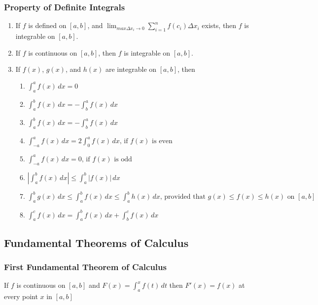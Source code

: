 \documentclass[11pt]{article}
\begin{document}
\subsubsection*{Property of Definite Integrals}
\begin{enumerate}
    \item If $f$ is defined on $[a,b]$, and $\displaystyle\lim_{max \Delta x_i\to 0}\sum_{i=1}^{n}f(c_i)\Delta x_i$ exists, 
        then $f$ is integrable on $[a,b]$.
    \item If $f$ is continuous on $[a,b]$, then $f$ is integrable on $[a,b]$.
    \item If $f(x)$, $g(x)$, and $h(x)$ are integrable on $[a,b]$, then
    \begin{enumerate}
        \item $
            \displaystyle
            \int_a^af(x)\,dx =0
        $
        \item $
            \displaystyle
            \int_a^bf(x)\,dx =-\int_b^af(x)\,dx
        $
        \item $
            \displaystyle
            \int_a^bf(x)\,dx =-\int_b^af(x)\,dx
        $
        \item $
            \displaystyle
            \int_{-a}^af(x)\,dx =2\int_0^af(x)\,dx\text{, if $f(x)$ is even}
        $
        \item $
            \displaystyle
            \int_{-a}^af(x)\,dx =0\text{, if $f(x)$ is odd}
        $
        \item $
            \displaystyle
            \left|\int_a^bf(x)\,dx\right|\leq\int_a^b|f(x)|\,dx
        $
        \item $
            \displaystyle
            \int_a^bg(x)\,dx\leq\int_a^bf(x)\,dx\leq\int_a^bh(x)\,dx \text{, provided that } g(x)\leq f(x)\leq h(x)\text{ on }[a,b]
        $
        \item $
            \displaystyle
            \int_a^cf(x)\,dx=\int_a^bf(x)\,dx+\int_b^cf(x)\,dx
        $
    \end{enumerate}
\end{enumerate}
\subsection{Fundamental Theorems of Calculus}
\subsubsection*{First Fundamental Theorem of Calculus}
If $f$ is continuous on $[a,b]$ and $\displaystyle F(x)=\int_a^xf(t)\,dt$
then $F'(x)=f(x)$ at every point $x$ in $[a,b]$
\end{document}
